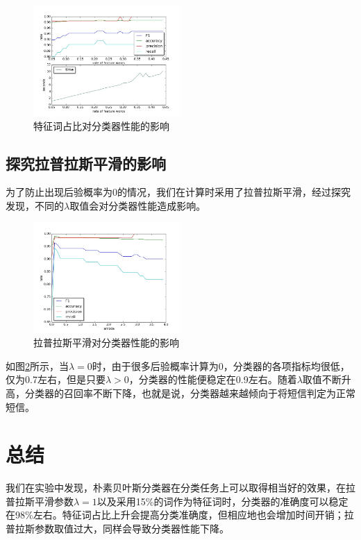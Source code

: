 \documentclass[a4paper, twocolumn, 12pt]{article}
\begin{document}
\begin{figure}
    \centering
    \includegraphics[width=0.5\textwidth]{fig_1.jpg}
    \caption{特征词占比对分类器性能的影响}
    \label{fig_1}
\end{figure}

\subsection{探究拉普拉斯平滑的影响}
为了防止出现后验概率为0的情况，我们在计算时采用了拉普拉斯平滑，经过探究发现，不同的$\lambda$取值会对分类器性能造成影响。\\


\begin{figure}[htbp]
    \centering
    \includegraphics[width=0.5\textwidth]{fig_2.jpg}
    \caption{拉普拉斯平滑对分类器性能的影响}
    \label{fig_2}
\end{figure}

如图\ref{fig_2}所示，当$\lambda=0$时，由于很多后验概率计算为0，分类器的各项指标均很低，仅为0.7左右，但是只要$\lambda>0$，分类器的性能便稳定在0.9左右。随着$\lambda$取值不断升高，分类器的召回率不断下降，也就是说，分类器越来越倾向于将短信判定为正常短信。

\section{总结}
我们在实验中发现，朴素贝叶斯分类器在分类任务上可以取得相当好的效果，在拉普拉斯平滑参数$\lambda=1$以及采用15\%的词作为特征词时，分类器的准确度可以稳定在98\%左右。特征词占比上升会提高分类准确度，但相应地也会增加时间开销；拉普拉斯参数取值过大，同样会导致分类器性能下降。
\end{document}

